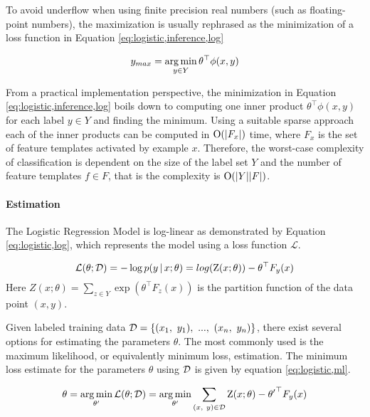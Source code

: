 To avoid underflow when using finite precision real numbers (such as
floating-point numbers), the maximization is usually rephrased as the
minimization of a loss function in Equation
\ref{eq:logistic,inference,log}

\begin{equation}y_{max} = \operatorname*{arg\,min}_{y\in Y} \theta^\top \phi(x,y)\label{eq:logistic,inference,log}\end{equation}

From a practical implementation perspective, the minimization in
Equation \ref{eq:logistic,inference,log} boils down to computing one
inner product $\theta^\top \phi(x,y)$ for each label $y \in Y$ and
finding the minimum. Using a suitable sparse approach each of the
inner products can be computed in $\mbox{${\rm O}$}(|F_x|)$ time, where $F_x$ is the
set of feature templates activated by example $x$. Therefore, the
worst-case complexity of classification is dependent on the size of
the label set $Y$ and the number of feature templates $f \in F$, that
is the complexity is $\mbox{${\rm O}$}(|Y||F|)$.

\paragraph{Estimation}
The Logistic Regression Model is log-linear as demonstrated by
Equation \ref{eq:logistic,log}, which represents the model using a
loss function $\mathcal{L}$.

\begin{equation}
\mathcal{L}(\theta\mbox{$ ; \, $}\mathcal{D}) = -\log p(y\mbox{$ \, | \, $} x\mbox{$ ; \, $} \theta) = log(\mbox{${\rm Z}$}(x;\theta)) - \theta^\top F_y(x)\label{eq:logistic,log}
\end{equation}
Here $Z(x;\theta) = \sum_{z \in Y}\exp(\theta^\top F_{z}(x))$ is the partition function of the data point $(x,y)$.

Given labeled training data $\mbox{${\mathcal{D}}$} = \{(x_1,\ y_1),\ ...,\
(x_n,\ y_n)\}$, there exist several options for estimating the
parameters $\theta$. The most commonly used is the maximum likelihood,
or equivalently minimum loss, estimation. The minimum loss estimate
for the parameters $\theta$ using $\mbox{${\mathcal{D}}$}$ is given by equation
\eqref{eq:logistic,ml}.

\begin{equation}
\theta = \operatorname*{arg\,min}_{\theta'} \mathcal{L}(\theta\mbox{$ ; \, $} \mathcal{D}) = \operatorname*{arg\,min}_{\theta'}\sum_{(x,\ y) \in \mathcal{D}} \mbox{${\rm Z}$}(x\mbox{$ ; \, $} \theta) - {\theta'}^\top F_y(x)\label{eq:logistic,ml}
\end{equation}

